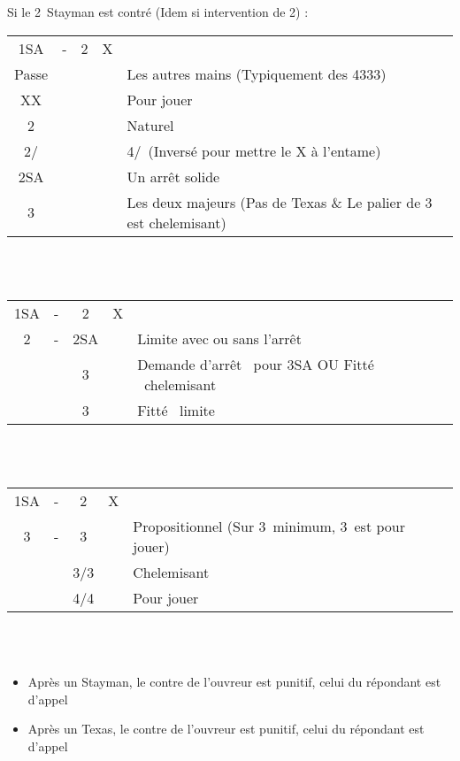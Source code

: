 \documentclass[a4paper, oneside, 11pt]{report}
\begin{document}
		Si le 2\trefle\ Stayman est contré (Idem si intervention de 2\carreau) :\\
		\begin{tabular}{cccc|l}
		1SA & - & 2\trefle & X &\\
		Passe &&&& Les autres mains (Typiquement des 4333)\\
		XX &&&& Pour jouer\\
		2\carreau &&&& Naturel\\
		2\coeur/\pique &&&& 4\pique/\coeur\ (Inversé pour mettre le X à l'entame)\\
		2SA &&&& Un arrêt solide\\
		3\trefle &&&& Les deux majeurs (Pas de Texas \& Le palier de 3 est chelemisant)\\
		\end{tabular}\\\\

		\begin{tabular}{cccc|l}
		1SA & - & 2\trefle & X &\\
		2\pique & - & 2SA && Limite avec ou sans l'arrêt \trefle\\
		&& 3\trefle && Demande d'arrêt \trefle\ pour 3SA OU Fitté \coeur\ chelemisant\\
		&& 3\coeur && Fitté \coeur\ limite\\
		\end{tabular}\\\\
		
		\begin{tabular}{cccc|l}
		1SA & - & 2\trefle & X &\\
		3\trefle & - & 3\carreau && Propositionnel (Sur 3\coeur\ minimum, 3\pique\ est pour jouer)\\
		&& 3\coeur/3\pique && Chelemisant\\
		&& 4\coeur/4\pique && Pour jouer\\
		\end{tabular}\\\\
		
\newpage
		\begin{itemize}
		\item Après un Stayman,  le contre de l'ouvreur est punitif,  celui du répondant est d'appel
		\item Après un Texas,  le contre de l'ouvreur est punitif,  celui du répondant est d'appel\\
		\end{itemize}
\end{document}
